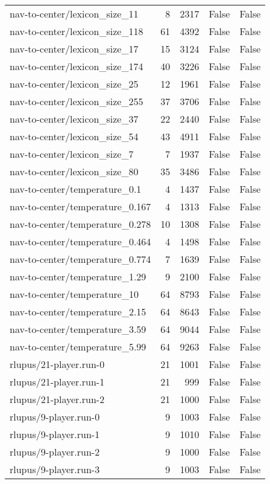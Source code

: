 \begin{tabular}{lrrrr}
nav-to-center/lexicon\_size\_11 & 8 & 2317 & False & False \\
nav-to-center/lexicon\_size\_118 & 61 & 4392 & False & False \\
nav-to-center/lexicon\_size\_17 & 15 & 3124 & False & False \\
nav-to-center/lexicon\_size\_174 & 40 & 3226 & False & False \\
nav-to-center/lexicon\_size\_25 & 12 & 1961 & False & False \\
nav-to-center/lexicon\_size\_255 & 37 & 3706 & False & False \\
nav-to-center/lexicon\_size\_37 & 22 & 2440 & False & False \\
nav-to-center/lexicon\_size\_54 & 43 & 4911 & False & False \\
nav-to-center/lexicon\_size\_7 & 7 & 1937 & False & False \\
nav-to-center/lexicon\_size\_80 & 35 & 3486 & False & False \\
nav-to-center/temperature\_0.1 & 4 & 1437 & False & False \\
nav-to-center/temperature\_0.167 & 4 & 1313 & False & False \\
nav-to-center/temperature\_0.278 & 10 & 1308 & False & False \\
nav-to-center/temperature\_0.464 & 4 & 1498 & False & False \\
nav-to-center/temperature\_0.774 & 7 & 1639 & False & False \\
nav-to-center/temperature\_1.29 & 9 & 2100 & False & False \\
nav-to-center/temperature\_10 & 64 & 8793 & False & False \\
nav-to-center/temperature\_2.15 & 64 & 8643 & False & False \\
nav-to-center/temperature\_3.59 & 64 & 9044 & False & False \\
nav-to-center/temperature\_5.99 & 64 & 9263 & False & False \\
rlupus/21-player.run-0 & 21 & 1001 & False & False \\
rlupus/21-player.run-1 & 21 & 999 & False & False \\
rlupus/21-player.run-2 & 21 & 1000 & False & False \\
rlupus/9-player.run-0 & 9 & 1003 & False & False \\
rlupus/9-player.run-1 & 9 & 1010 & False & False \\
rlupus/9-player.run-2 & 9 & 1000 & False & False \\
rlupus/9-player.run-3 & 9 & 1003 & False & False \\
\bottomrule
\end{tabular}
